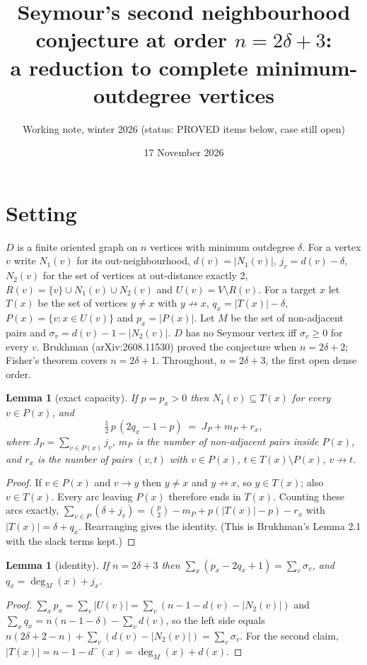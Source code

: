 \documentclass[11pt]{article}
\title{Seymour's second neighbourhood conjecture at order $n=2\delta+3$:\\ a reduction to complete minimum-outdegree vertices}
\author{Working note, winter 2026 (status: PROVED items below, case still open)}
\date{17 November 2026}
\newtheorem{lemma}[theorem]{Lemma}
\theoremstyle{definition}
\begin{document}
\maketitle

\section*{Setting}
$D$ is a finite oriented graph on $n$ vertices with minimum outdegree $\delta$. For a vertex $v$ write $N_1(v)$ for its
out-neighbourhood, $d(v)=|N_1(v)|$, $j_v=d(v)-\delta$, $N_2(v)$ for the set of vertices at out-distance exactly $2$,
$R(v)=\{v\}\cup N_1(v)\cup N_2(v)$ and $U(v)=V\setminus R(v)$. For a target $x$ let $T(x)$ be the set of vertices
$y\neq x$ with $y\not\to x$, $q_x=|T(x)|-\delta$, $P(x)=\{v: x\in U(v)\}$ and $p_x=|P(x)|$. Let $M$ be the set of
non-adjacent pairs and $\sigma_v=d(v)-1-|N_2(v)|$. $D$ has no Seymour vertex iff $\sigma_v\ge 0$ for every $v$.
Brukhman (arXiv:2608.11530) proved the conjecture when $n=2\delta+2$; Fisher's theorem covers $n=2\delta+1$.
Throughout, $n=2\delta+3$, the first open dense order.

\begin{lemma}[exact capacity]\label{cap}
If $p=p_x>0$ then $N_1(v)\subseteq T(x)$ for every $v\in P(x)$, and
\[ \tfrac12\,p\,(2q_x-1-p) \;=\; J_P+m_P+r_x, \]
where $J_P=\sum_{v\in P(x)}j_v$, $m_P$ is the number of non-adjacent pairs inside $P(x)$, and $r_x$ is the number of
pairs $(v,t)$ with $v\in P(x)$, $t\in T(x)\setminus P(x)$, $v\not\to t$.
\end{lemma}
\begin{proof}
If $v\in P(x)$ and $v\to y$ then $y\ne x$ and $y\not\to x$, so $y\in T(x)$; also $v\in T(x)$. Every arc leaving
$P(x)$ therefore ends in $T(x)$. Counting these arcs exactly,
$\sum_{v\in P}(\delta+j_v)=\binom p2-m_P+p(|T(x)|-p)-r_x$ with $|T(x)|=\delta+q_x$. Rearranging gives the identity.
(This is Brukhman's Lemma 2.1 with the slack terms kept.)
\end{proof}

\begin{lemma}[identity]\label{id}
If $n=2\delta+3$ then $\sum_x (p_x-2q_x+1)=\sum_v \sigma_v$, and $q_x=\deg_M(x)+j_x$.
\end{lemma}
\begin{proof}
$\sum_x p_x=\sum_v|U(v)|=\sum_v(n-1-d(v)-|N_2(v)|)$ and $\sum_x q_x=n(n-1-\delta)-\sum_v d(v)$, so the left side equals
$n(2\delta+2-n)+\sum_v(d(v)-|N_2(v)|)=\sum_v\sigma_v$. For the second claim, $|T(x)|=n-1-d^-(x)=\deg_M(x)+d(x)$.
\end{proof}
\end{document}
